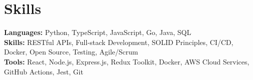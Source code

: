 \documentclass[11pt]{article}
\begin{document}
\vspace{-18.5pt}

\section*{Skills}
\textbf{Languages:} Python, TypeScript, JavaScript, Go, Java, SQL\\
\textbf{Skills:} RESTful APIs, Full-stack Development, SOLID Principles, CI/CD, Docker, Open Source, Testing, Agile/Scrum\\
\textbf{Tools:} React, Node.js, Express.js, Redux Toolkit, Docker, AWS Cloud Services, GitHub Actions, Jest, Git

\vspace{-6.5pt}
\end{document}

